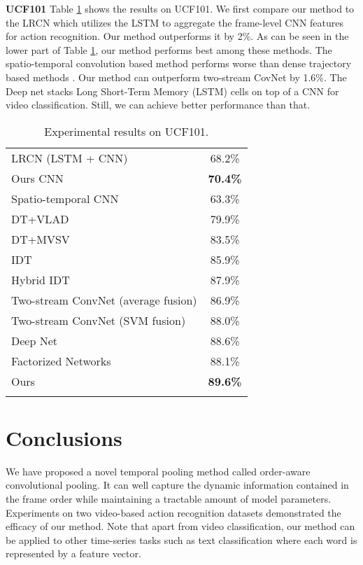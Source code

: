 \documentclass[journal]{IEEEtran}
\begin{document}
\noindent \textbf{UCF101}
Table \ref{tab:overall-ucf101} shows the results on UCF101. We first compare our method to the LRCN \cite{Donahue_2015_CVPR} which utilizes the LSTM to aggregate the frame-level CNN features for action recognition. Our method outperforms it by 2\%. As can be seen in the lower part of Table \ref{tab:overall-ucf101}, our method performs best among these methods. The spatio-temporal convolution based method \cite{KarpathyCVPR14} performs worse than dense trajectory based methods \cite{6909477,Wang2013,peng14}. Our method can outperform two-stream CovNet \cite{Andrew14} by 1.6\%.
The Deep net \cite{Ng2015} stacks Long Short-Term Memory (LSTM) cells on top of a CNN for video classification. Still, we can achieve better performance than that.
\begin{table}[htbp]\normalsize
\caption{Experimental results on UCF101.}
  \centering

  \renewcommand{\arraystretch}{1.1}
    \begin{tabular*}{8cm}{lc}
    \hline \noalign{\smallskip}
    LRCN \cite{Donahue_2015_CVPR} (LSTM + CNN) & 68.2\% \\
    Ours CNN & \textbf{70.4\%} \\
    \hline \noalign{\smallskip}
    Spatio-temporal CNN \cite{KarpathyCVPR14} & 63.3\% \\
    DT+VLAD \cite{6909477} & 79.9\% \\
    DT+MVSV \cite{6909477} & 83.5\% \\
    IDT \cite{Wang2013} & 85.9\% \\
    Hybrid IDT \cite{peng14} & 87.9\% \\
    Two-stream ConvNet (average fusion) \cite{Andrew14} & 86.9\% \\
    Two-stream ConvNet (SVM fusion) \cite{Andrew14} & 88.0\% \\
    Deep Net \cite{Ng2015} & 88.6\% \\
    Factorized Networks \cite{Sun_2015_ICCV} & 88.1\% \\
    Ours & \textbf{89.6\%}
    \\ \hline \noalign{\smallskip}
    \end{tabular*}%

  \label{tab:overall-ucf101}%
\end{table}%



\section{Conclusions}
\label{conclusion}
We have proposed a novel temporal pooling method called order-aware convolutional pooling. It can well capture the dynamic information contained in the frame order while maintaining a tractable amount of model parameters. Experiments on two video-based action recognition datasets demonstrated the efficacy of our method. Note that apart from video classification, our method can be applied to other time-series tasks such as text classification where each word is represented by a feature vector.
\end{document}
